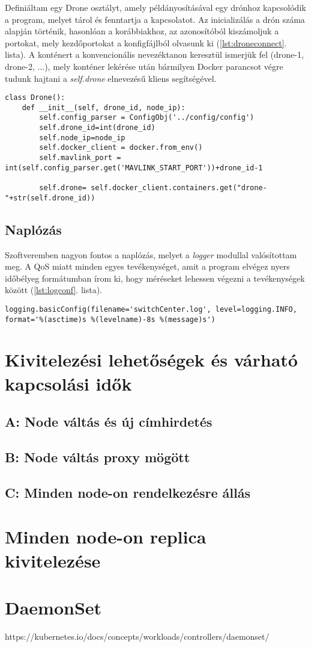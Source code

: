 \noindent
Definiáltam egy Drone osztályt, amely példányosításával egy drónhoz kapcsolódik a program, melyet tárol és fenntartja a kapcsolatot. Az inicializálás a drón száma alapján történik, hasonlóan a korábbiakhoz, az azonosítóból kiszámoljuk a portokat, mely kezdőportokat a konfigfájlból olvasunk ki (\ref{lst:droneconnect}. lista). A konténert a konvencionális nevezéktanon keresztül ismerjük fel (drone-1, drone-2, ...), mely konténer lekérése után bármilyen Docker parancsot végre tudunk hajtani a \emph{self.drone} elnevezésű kliens segítségével.

\begin{lstlisting}[caption={Drón konténeréhez csatlakozás}, label={lst:droneconnect}]
class Drone():
	def __init__(self, drone_id, node_ip):
		self.config_parser = ConfigObj('../config/config')
		self.drone_id=int(drone_id)
		self.node_ip=node_ip
		self.docker_client = docker.from_env()
		self.mavlink_port = int(self.config_parser.get('MAVLINK_START_PORT'))+drone_id-1

		self.drone= self.docker_client.containers.get("drone-"+str(self.drone_id))
\end{lstlisting}

\subsection{Naplózás}
Szoftveremben nagyon fontos a naplózás, melyet a \emph{logger} modullal valósítottam meg. A QoS miatt minden egyes tevékenységet, amit a program elvégez nyers időbélyeg formátumban írom ki, hogy méréseket lehessen végezni a tevékenységek között (\ref{lst:logconf}. lista).

\begin{lstlisting}[caption={Naplózás beállítása}, label={lst:logconf}]
logging.basicConfig(filename='switchCenter.log', level=logging.INFO, format='%(asctime)s %(levelname)-8s %(message)s')
\end{lstlisting}

\section{Kivitelezési lehetőségek és várható kapcsolási idők}

\subsection{A: Node váltás és új címhirdetés}
\subsection{B: Node váltás proxy mögött}
\subsection{C: Minden node-on rendelkezésre állás}

\section{Minden node-on replica kivitelezése}

\section{DaemonSet}
https://kubernetes.io/docs/concepts/workloads/controllers/daemonset/